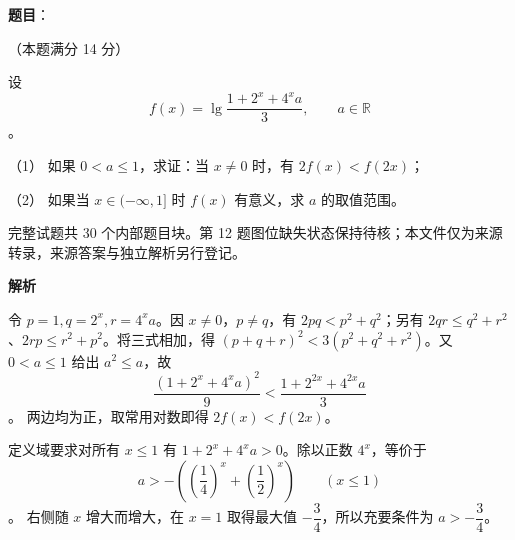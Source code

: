 \begin{answer}

\textbf{题目}：

（本题满分 14 分）

设
\nopagebreak[4]
\[
f(x)=\lg\frac{1+2^x+4^xa}{3},\qquad a\in\mathbb R
\]
。

（1） 如果 $0<a\le1$，求证：当 $x\ne0$ 时，有 $2f(x)<f(2x)$；

（2） 如果当 $x\in(-\infty,1]$ 时 $f(x)$ 有意义，求 $a$ 的取值范围。

\begin{gktip}
完整试题共 30 个内部题目块。第 12 题图位缺失状态保持待核；本文件仅为来源转录，来源答案与独立解析另行登记。
\end{gktip}

\textbf{解析}


令 $p=1,q=2^x,r=4^xa$。因 $x\ne0$，$p\ne q$，有 $2pq<p^2+q^2$；另有 $2qr\le q^2+r^2$、$2rp\le r^2+p^2$。将三式相加，得 $(p+q+r)^2<3(p^2+q^2+r^2)$。又 $0<a\le1$ 给出 $a^2\le a$，故
\nopagebreak[4]
\[
\frac{(1+2^x+4^xa)^2}{9}<\frac{1+2^{2x}+4^{2x}a}{3}
\]
。
两边均为正，取常用对数即得 $2f(x)<f(2x)$。


定义域要求对所有 $x\le1$ 有 $1+2^x+4^xa>0$。除以正数 $4^x$，等价于
\nopagebreak[4]
\[
a>-\left(\left(\frac14\right)^x+\left(\frac12\right)^x\right)\qquad(x\le1)
\]
。
右侧随 $x$ 增大而增大，在 $x=1$ 取得最大值 $-\dfrac34$，所以充要条件为 $a>-\dfrac34$。



\end{answer}